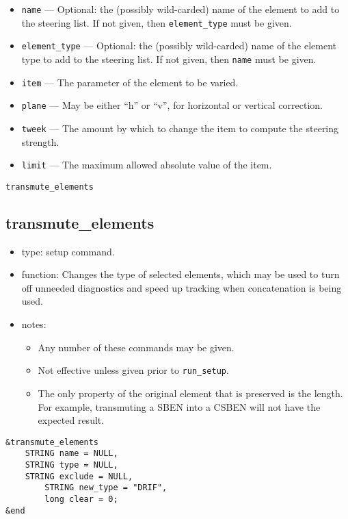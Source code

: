 \documentclass[11pt]{article}
\begin{document}
\begin{itemize}
\item \verb|name| --- Optional: the (possibly wild-carded) name of the element to add to the steering list.
        If not given, then \verb|element_type| must be given.
\item \verb|element_type| --- Optional: the (possibly wild-carded) name of the element type to add to the
        steering list.  If not given, then \verb|name| must be given.
\item \verb|item| --- The parameter of the element to be varied.
\item \verb|plane| --- May be either ``h'' or ``v'', for horizontal or vertical correction.
\item \verb|tweek| --- The amount by which to change the item to compute the steering strength.
\item \verb|limit| --- The maximum allowed absolute value of the item.
\end{itemize}

\begin{latexonly}
\newpage
\begin{center}{\Large\verb|transmute_elements|}\end{center}
\end{latexonly}
\subsection{transmute\_elements}

\begin{itemize}
\item type: setup command.
\item function: Changes the type of selected elements, which may be used to
	turn off unneeded diagnostics and speed up tracking when concatenation
	is being used.
\item notes: 
	\begin{itemize}
	\item Any number of these commands may be given.
	\item Not effective unless given prior to \verb|run_setup|.
	\item The only property of the original element that is preserved is
	the length.  For example, transmuting a SBEN into a CSBEN will not
	have the expected result.
	\end{itemize}
\end{itemize}

\begin{verbatim}
&transmute_elements
	STRING name = NULL,
	STRING type = NULL,
	STRING exclude = NULL,
        STRING new_type = "DRIF",
        long clear = 0;
&end
\end{verbatim}
\end{document}
